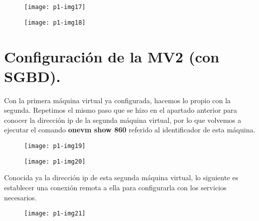 \documentclass[10pt]{article}
\begin{document}
\begin{figure}[H]
	\begin{center}
 		\texttt{[image: p1-img17]}
	\end{center} 
\end{figure}

\begin{figure}[H]
	\begin{center}
 		\texttt{[image: p1-img18]}
	\end{center} 
\end{figure}


\section{Configuración de la MV2 (con SGBD).} 
Con la primera máquina virtual ya configurada, hacemos lo propio con la segunda. Repetimos el mismo paso que se hizo en el apartado anterior para conocer la dirección ip de la segunda máquina virtual, por lo que volvemos a ejecutar el comando \textbf{onevm show 860} referido al identificador de esta máquina.\\

\begin{figure}[H]
	\begin{center}
 		\texttt{[image: p1-img19]}
	\end{center} 
\end{figure}

\begin{figure}[H]
	\begin{center}
 		\texttt{[image: p1-img20]}
	\end{center} 
\end{figure}

Conocida ya la dirección ip de esta segunda máquina virtual, lo siguiente es establecer una conexión remota a ella para configurarla con los servicios necesarios.\\

\begin{figure}[H]
	\begin{center}
 		\texttt{[image: p1-img21]}
	\end{center} 
\end{figure}
\end{document}
